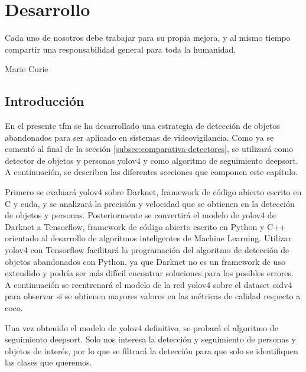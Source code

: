 
\chapter{Desarrollo}
\label{cha:desarrollo}

\begin{FraseCelebre}
  \begin{Frase}
    Cada uno de nosotros debe trabajar para su propia mejora, y al mismo tiempo compartir una responsabilidad general para toda la humanidad.
  \end{Frase}
  \begin{Fuente}
    Marie Curie
  \end{Fuente}
\end{FraseCelebre}

\section{Introducción}
\label{sec:intro-desarrollo}

En el presente \gls{tfm} se ha desarrollado una estrategia de detección de objetos abandonados para ser aplicado en sistemas de videovigilancia. Como ya se comentó al final de la sección \ref{subsec:comparativa-detectores}, se utilizará como detector de objetos y personas \gls{yolov4} y como algoritmo de seguimiento \gls{deepsort}. A continuación, se describen las diferentes secciones que componen este capítulo.

Primero se evaluará \gls{yolov4} sobre Darknet, framework de código abierto escrito en C y \gls{cuda}, y se analizará la precisión y velocidad que se obtienen en la detección de objetos y personas. Posteriormente se convertirá el modelo de \gls{yolov4} de Darknet a Tensorflow, framework de código abierto escrito en Python y C++ orientado al desarrollo de algoritmos inteligentes de Machine Learning. Utilizar \gls{yolov4} con Tensorflow facilitará la programación del algoritmo de detección de objetos abandonados con Python, ya que Darknet no es un framework de uso extendido y podría ser más difícil encontrar soluciones para los posibles errores. A continuación se reentrenará el modelo de la red \gls{yolov4} sobre el dataset \gls{oidv4} para observar si se obtienen mayores valores en las métricas de calidad respecto a \gls{coco}.

Una vez obtenido el modelo de \gls{yolov4} definitivo, se probará el algoritmo de seguimiento \gls{deepsort}. Solo nos interesa la detección y seguimiento de personas y objetos de interés, por lo que se filtrará la detección para que solo se identifiquen las clases que queremos.


